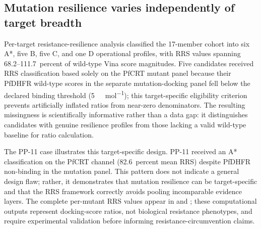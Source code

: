 \documentclass[journal=jcisd8,manuscript=article]{achemso}
\begin{document}
\subsection{Mutation resilience varies independently of target breadth}
Per-target resistance-resilience analysis classified the 17-member cohort into six A*, five B, five C, and one D operational profiles, with RRS values spanning \numrange{68.2}{111.7}~percent of wild-type Vina score magnitudes. Five candidates received RRS classification based solely on the PfCRT mutant panel because their PfDHFR wild-type scores in the separate mutation-docking panel fell below the declared binding threshold (\qty{5}{\kilo\calorie\per\mole}); this target-specific eligibility criterion prevents artificially inflated ratios from near-zero denominators. The resulting missingness is scientifically informative rather than a data gap: it distinguishes candidates with genuine resilience profiles from those lacking a valid wild-type baseline for ratio calculation.

The PP-11 case illustrates this target-specific design. PP-11 received an A* classification on the PfCRT channel (\num{82.6}~percent mean RRS) despite PfDHFR non-binding in the mutation panel. This pattern does not indicate a general design flaw; rather, it demonstrates that mutation resilience can be target-specific and that the RRS framework correctly avoids pooling incomparable evidence layers. The complete per-mutant RRS values appear in  and ; these computational outputs represent docking-score ratios, not biological resistance phenotypes, and require experimental validation before informing resistance-circumvention claims.
\end{document}
